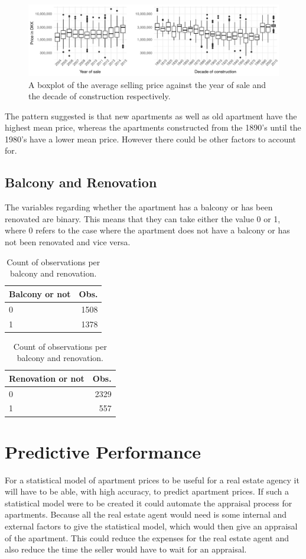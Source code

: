 \begin{figure}[H]
    \centering
    \includegraphics[width = \textwidth]{figures/Data_introduction/house_price_year.pdf}
    \caption{A boxplot of the average selling price against the year of sale and the decade of construction respectively.}
    \label{fig:house_price_year}
\end{figure}
The pattern suggested is that new apartments as well as old apartment have the highest mean price, whereas the apartments constructed from the 1890's until the 1980's have a lower mean price.
However there could be other factors to account for.

\subsection*{Balcony and Renovation}
The variables regarding whether the apartment has a balcony or has been renovated are binary.
This means that they can take either the value 0 or 1, where 0 refers to the case where the apartment does not have a balcony or has not been renovated and vice versa.
\begin{table}[H]
    \centering
    \begin{tabular}{lr}
        \toprule
        \textbf{Balcony or not} & \textbf{Obs.}\\
        \midrule
        0 & 1508\\
        1 & 1378\\
        \bottomrule
    \end{tabular}
    \hspace{20pt}
    \begin{tabular}{lr}
        \toprule
        \textbf{Renovation or not} & \textbf{Obs.}\\
        \midrule
        0 & 2329\\
        1 & 557\\
        \bottomrule
    \end{tabular}
    \caption{Count of observations per balcony and renovation.}
\end{table}

\section{Predictive Performance}
For a statistical model of apartment prices to be useful for a real estate agency it will have to be able, with high accuracy, to predict apartment prices.
If such a statistical model were to be created it could automate the appraisal process for apartments.
Because all the real estate agent would need is some internal and external factors to give the statistical model, which would then give an appraisal of the apartment.
This could reduce the expenses for the real estate agent and also reduce the time the seller would have to wait for an appraisal.

